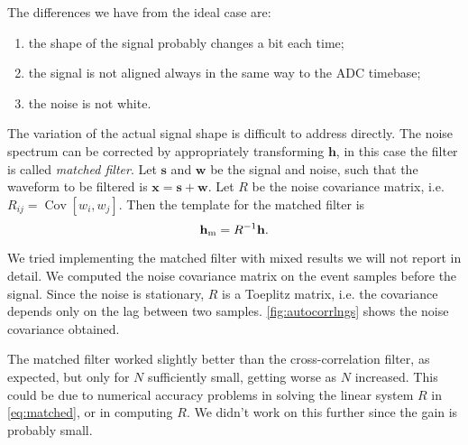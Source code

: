 The differences we have from the ideal case are:
%
\begin{enumerate}
    \item the shape of the signal probably changes a bit each time;
    \item the signal is not aligned always in the same way to the ADC timebase;
    \item the noise is not white.
\end{enumerate}

The variation of the actual signal shape is difficult to address directly. The
noise spectrum can be corrected by appropriately transforming $\mathbf h$, in
this case the filter is called \emph{matched filter}. Let $\mathbf s$ and
$\mathbf w$ be the signal and noise, such that the waveform to be filtered is
$\mathbf x = \mathbf s + \mathbf w$. Let $R$ be the noise covariance matrix,
i.e. $R_{ij} = \operatorname{Cov}[w_i, w_j]$. Then the template for the matched
filter is
%
\begin{equation}
    \mathbf h_\text m = R^{-1} \mathbf h.
    \label{eq:matched}    
\end{equation}


We tried implementing the matched filter with mixed results we will not report
in detail. We computed the noise covariance matrix on the event samples before
the signal. Since the noise is stationary, $R$ is a Toeplitz matrix, i.e. the
covariance depends only on the lag between two samples.
\autoref{fig:autocorrlngs} shows the noise covariance obtained.


\begin{figure}
    

\end{figure}

The matched filter worked slightly better than the cross-correlation filter, as
expected, but only for $N$ sufficiently small, getting worse as $N$ increased.
This could be due to numerical accuracy problems in solving the linear system
$R$ in \autoref{eq:matched}, or in computing $R$. We didn't work on this
further since the gain is probably small.

